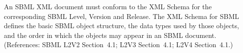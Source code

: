 An SBML XML document must conform to the XML Schema for the corresponding
SBML Level, Version and Release.  The XML Schema for SBML defines the basic
SBML object structure, the data types used by those objects, and the order
in which the objects may appear in an SBML document.  (References: SBML
L2V2 Section~4.1; L2V3 Section~4.1; L2V4 Section~4.1.)
